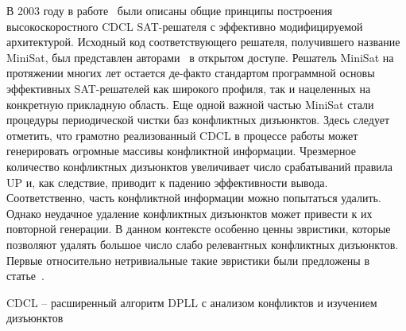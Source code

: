 В 2003 году в работе~\cite{minisat} были описаны общие принципы построения высокоскоростного CDCL SAT-решателя с эффективно модифицируемой архитектурой.
Исходный код соответствующего решателя, получившего название MiniSat, был представлен авторами~\cite{minisat} в открытом доступе.
Решатель MiniSat на протяжении многих лет остается де-факто стандартом программной основы эффективных SAT-решателей как широкого профиля, так и нацеленных на конкретную прикладную область.
Еще одной важной частью MiniSat стали процедуры периодической чистки баз конфликтных дизъюнктов.
Здесь следует отметить, что грамотно реализованный CDCL в процессе работы может генерировать огромные массивы конфликтной информации.
Чрезмерное количество конфликтных дизъюнктов увеличивает число срабатываний правила UP и, как следствие, приводит к падению эффективности вывода.
Соответственно, часть конфликтной информации можно попытаться удалить.
Однако неудачное удаление конфликтных дизъюнктов может привести к их повторной генерации.
В данном контексте особенно ценны эвристики, которые позволяют удалять большое число слабо релевантных конфликтных дизъюнктов.
Первые относительно нетривиальные такие эвристики были предложены в статье~\cite{glucose}.

\begin{algorithm}[!ht]
    \caption{CDCL \--- расширенный алгоритм DPLL с анализом конфликтов и изучением дизъюнктов}
    \label{alg:cdcl}
    \DontPrintSemicolon



\end{algorithm}

